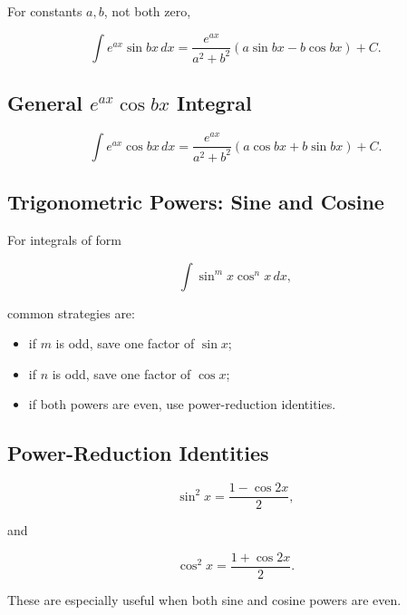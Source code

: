 For constants \(a,b\), not both zero,

\[
\boxed{
\int
e^{ax}\sin bx
\,dx
=
\frac{
e^{ax}
}{
a^2+b^2
}
\left(
a\sin bx-b\cos bx
\right)
+
C.
}
\]

\subsection{General \(e^{ax}\cos bx\) Integral}
\label{subsec:general-exp-cos-integral}

\[
\boxed{
\int
e^{ax}\cos bx
\,dx
=
\frac{
e^{ax}
}{
a^2+b^2
}
\left(
a\cos bx+b\sin bx
\right)
+
C.
}
\]

\subsection{Trigonometric Powers: Sine and Cosine}
\label{subsec:sine-cosine-powers-integrals}

For integrals of form

\[
\int
\sin^m x
\cos^n x
\,dx,
\]

common strategies are:

\begin{itemize}
    \item if \(m\) is odd, save one factor of \(\sin x\);
    \item if \(n\) is odd, save one factor of \(\cos x\);
    \item if both powers are even, use power-reduction identities.
\end{itemize}

\subsection{Power-Reduction Identities}
\label{subsec:power-reduction-integral-table}

\[
\boxed{
\sin^2x
=
\frac{
1-\cos2x
}{2},
}
\]

and

\[
\boxed{
\cos^2x
=
\frac{
1+\cos2x
}{2}.
}
\]

These are especially useful when both sine and cosine powers are even.

